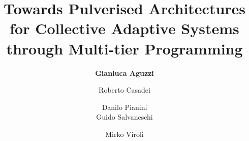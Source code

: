 \title{Towards Pulverised Architectures for Collective Adaptive Systems through Multi-tier Programming}
\author[G.Aguzzi]{
  \textbf{Gianluca Aguzzi} \and
  Roberto Casadei \and
  Danilo Pianini \\
  Guido Salvaneschi \and
  Mirko Viroli
}
